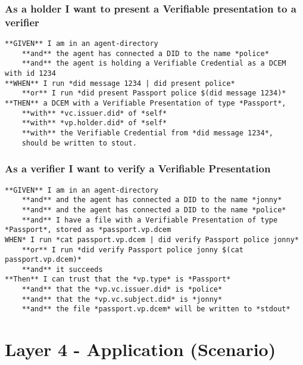 \hypertarget{as-a-holder-i-want-to-present-a-verifiable-presentation-to-a-verifier}{%
\subsubsection{As a holder I want to present a Verifiable presentation
to a
verifier}\label{as-a-holder-i-want-to-present-a-verifiable-presentation-to-a-verifier}}

\begin{lstlisting}
**GIVEN** I am in an agent-directory
    **and** the agent has connected a DID to the name *police*
    **and** the agent is holding a Verifiable Credential as a DCEM with id 1234
**WHEN** I run *did message 1234 | did present police*
    **or** I run *did present Passport police $(did message 1234)*
**THEN** a DCEM with a Verifiable Presentation of type *Passport*, 
    **with** *vc.issuer.did* of *self*
    **with** *vp.holder.did* of *self*
    **with** the Verifiable Credential from *did message 1234*, 
    should be written to stout.
\end{lstlisting}

\hypertarget{as-a-verifier-i-want-to-verify-a-verifiable-presentation}{%
\subsubsection{As a verifier I want to verify a Verifiable
Presentation}\label{as-a-verifier-i-want-to-verify-a-verifiable-presentation}}

\begin{lstlisting}
**GIVEN** I am in an agent-directory
    **and** and the agent has connected a DID to the name *jonny*
    **and** and the agent has connected a DID to the name *police*
    **and** I have a file with a Verifiable Presentation of type *Passport*, stored as *passport.vp.dcem
WHEN* I run *cat passport.vp.dcem | did verify Passport police jonny*
    **or** I run *did verify Passport police jonny $(cat passport.vp.dcem)*
    **and** it succeeds
**Then** I can trust that the *vp.type* is *Passport*
    **and** that the *vp.vc.issuer.did* is *police*
    **and** that the *vp.vc.subject.did* is *jonny*
    **and** the file *passport.vp.dcem* will be written to *stdout*
\end{lstlisting}

\hypertarget{layer-4---application-scenario}{%
\section{Layer 4 - Application
(Scenario)}\label{layer-4---application-scenario}}

